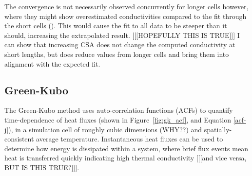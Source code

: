 The convergence is not necessarily observed concurrently for longer cells however, where they might show overestimated conductivities compared to the fit through the short cells (\cite{Hu2011}). This would cause the fit to all data to be steeper than it should, increasing the extrapolated result.  [[[HOPEFULLY THIS IS TRUE]]] I can show that increasing CSA does not change the computed conductivity at short lengths, but does reduce values from longer cells and bring them into alignment with the expected fit.





\subsection{Green-Kubo}
The Green-Kubo method uses auto-correlation functions (ACFs) to quantify time-dependence of heat fluxes (shown in Figure~\ref{fig:gk_acf}, and Equation \ref{acf-j}), in a simulation cell of roughly cubic dimensions (WHY??) and spatially-consistent average temperature. Instantaneous heat fluxes can be used to determine how energy is dissipated within a system, where brief flux events mean heat is transferred quickly indicating high thermal conductivity [[[and vice versa, BUT IS THIS TRUE?]]]. 

